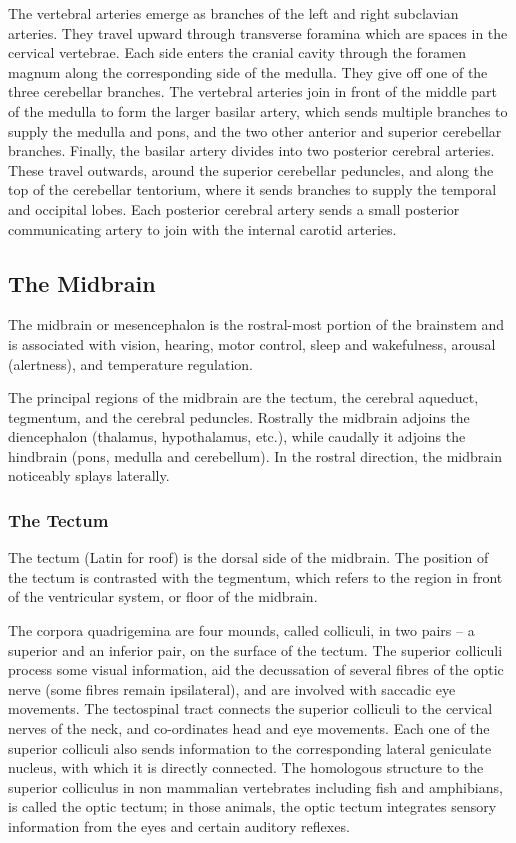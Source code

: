The vertebral arteries emerge as branches of the left and right subclavian arteries. They travel upward through transverse foramina which are spaces in the cervical vertebrae. Each side enters the cranial cavity through the foramen magnum along the corresponding side of the medulla. They give off one of the three cerebellar branches. The vertebral arteries join in front of the middle part of the medulla to form the larger basilar artery, which sends multiple branches to supply the medulla and pons, and the two other anterior and superior cerebellar branches. Finally, the basilar artery divides into two posterior cerebral arteries. These travel outwards, around the superior cerebellar peduncles, and along the top of the cerebellar tentorium, where it sends branches to supply the temporal and occipital lobes. Each posterior cerebral artery sends a small posterior communicating artery to join with the internal carotid arteries.

\hypertarget{the-midbrain}{%
\subsection{The Midbrain}\label{the-midbrain}}

The midbrain or mesencephalon is the rostral-most portion of the brainstem and is associated with vision, hearing, motor control, sleep and wakefulness, arousal (alertness), and temperature regulation.

The principal regions of the midbrain are the tectum, the cerebral aqueduct, tegmentum, and the cerebral peduncles. Rostrally the midbrain adjoins the diencephalon (thalamus, hypothalamus, etc.), while caudally it adjoins the hindbrain (pons, medulla and cerebellum). In the rostral direction, the midbrain noticeably splays laterally.

\hypertarget{the-tectum}{%
\subsubsection{The Tectum}\label{the-tectum}}

The tectum (Latin for roof) is the dorsal side of the midbrain. The position of the tectum is contrasted with the tegmentum, which refers to the region in front of the ventricular system, or floor of the midbrain.

The corpora quadrigemina are four mounds, called colliculi, in two pairs -- a superior and an inferior pair, on the surface of the tectum. The superior colliculi process some visual information, aid the decussation of several fibres of the optic nerve (some fibres remain ipsilateral), and are involved with saccadic eye movements. The tectospinal tract connects the superior colliculi to the cervical nerves of the neck, and co-ordinates head and eye movements. Each one of the superior colliculi also sends information to the corresponding lateral geniculate nucleus, with which it is directly connected. The homologous structure to the superior colliculus in non mammalian vertebrates including fish and amphibians, is called the optic tectum; in those animals, the optic tectum integrates sensory information from the eyes and certain auditory reflexes.

